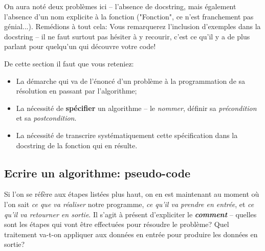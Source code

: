 \documentclass[12pt]{article}
\begin{document}
	\begin{MaReponse}
		On aura noté deux problèmes ici -- l'absence de docstring, mais également l'absence d'un nom explicite à la fonction ("Fonction", ce n'est franchement pas génial...). Remédions à tout cela:
		Vous remarquerez l'inclusion d'exemples dans la docstring -- il ne faut surtout pas hésiter à y recourir, c'est ce qu'il y a de plus parlant pour quelqu'un qui découvre votre code!
	\end{MaReponse}
	
	\begin{MonRet}
		De cette section il faut que vous reteniez:
		\begin{itemize}
			\item La démarche qui va de l'énoncé d'un problème à la programmation de sa résolution en passant par l'algorithme;
			\item La nécessité de \textbf{spécifier} un algorithme -- le \textit{nommer}, définir sa \textit{précondition} et sa \textit{postcondition}.
			\item La nécessité de transcrire systématiquement cette spécification dans la docstring de la fonction qui en résulte.
		\end{itemize}
	\end{MonRet}
	
	\subsection{Ecrire un algorithme: pseudo-code}

	Si l'on se réfère aux étapes listées plus haut, on en est maintenant au moment où l'on sait \textit{ce que va réaliser} notre programme, \textit{ce qu'il va prendre en entrée}, et \textit{ce qu'il va retourner en sortie}. Il s'agit à présent d'expliciter le \textit{\textbf{comment}} -- quelles sont les étapes qui vont être effectuées pour résoudre le problème? Quel traitement va-t-on appliquer aux données en entrée pour produire les données en sortie?
	
\end{document}
